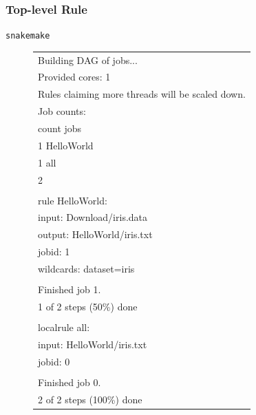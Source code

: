 \begin{frame}

\frametitle{Top-level Rule}

{\magenta{\$  }}  {\texttt{snakemake}}
{\tiny{
\begin{figure}
  \centering
  \begin{tabular}{l}
Building DAG of jobs... \\
Provided cores: 1 \\
Rules claiming more threads will be scaled down. \\
Job counts: \\
	count	jobs \\
	1	HelloWorld \\
	1	all \\
	2 \\
 \\
rule HelloWorld: \\
    input: Download/iris.data \\
    output: HelloWorld/iris.txt \\
    jobid: 1 \\
    wildcards: dataset=iris \\
 \\
Finished job 1. \\
1 of 2 steps (50\%) done \\
 \\
localrule all: \\
    input: HelloWorld/iris.txt \\
    jobid: 0 \\
 \\
Finished job 0. \\
2 of 2 steps (100\%) done \\
  \end{tabular}
\end{figure}
}}

\end{frame}


